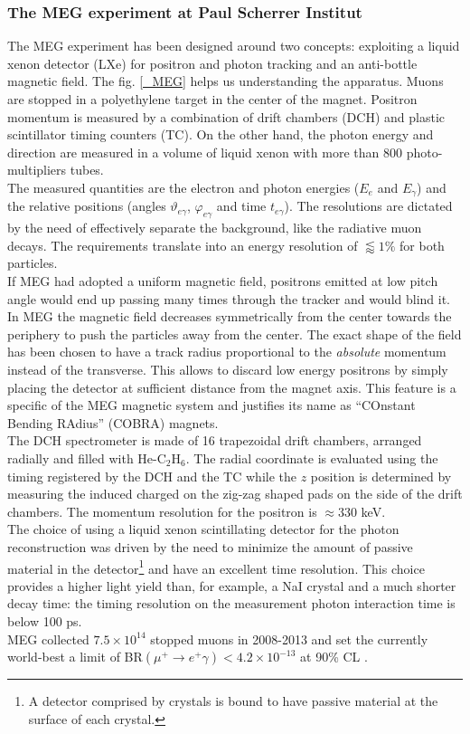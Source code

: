\documentclass[12pt,a4paper,openright, oneside, titlepage]{book} %
\begin{document}
\subsubsection{The MEG experiment at Paul Scherrer Institut}
The MEG experiment \cite{MEG} has been designed around two concepts: exploiting a liquid xenon detector (LXe) for positron and photon tracking and an anti-bottle magnetic field. 
The fig. \ref{_MEG} helps us understanding the apparatus. Muons are stopped in a polyethylene target in the center of the magnet. Positron momentum is measured by a combination of drift chambers (DCH) and plastic scintillator timing counters (TC). 
On the other hand, the photon energy and direction are measured in a volume of liquid xenon with more than 800 photo-multipliers tubes.\\
The measured quantities are the electron and photon energies ($E_e$ and $E_\gamma$) and the relative positions (angles $\vartheta_{e\gamma}$, $\varphi_{e\gamma}$ and time $t_{e\gamma}$). 
The resolutions are dictated by the need of effectively separate the background, like the radiative muon decays. 
The requirements translate into an energy resolution of $\lessapprox 1\%$ for both particles.\\
If MEG had adopted a uniform magnetic field, positrons emitted at low pitch angle would end up passing many times through the tracker and would blind it. 
In MEG the magnetic field decreases symmetrically from the center towards the periphery to push the particles away from the center. 
The exact shape of the field has been chosen to have a track radius proportional to the \textit{absolute} momentum instead of the transverse. 
This allows to discard low energy positrons by simply placing the detector at sufficient distance from the magnet axis. 
This feature is a specific of the MEG magnetic system and justifies its name as ``COnstant Bending RAdius'' (COBRA) magnets.\\
The DCH spectrometer is made of 16 trapezoidal drift chambers, arranged radially and filled with He-C$_2$H$_6$. The radial coordinate is evaluated using the timing registered by the DCH and the TC while the $z$ position is determined by measuring the induced charged on the zig-zag shaped pads on the side of the drift chambers. The momentum resolution for the positron is $\approx330$ keV.\\
The choice of using a liquid xenon scintillating detector for the photon reconstruction was driven by the need to minimize the amount of passive material in the detector\footnote{A detector comprised by crystals is bound to have passive material at the surface of each crystal.} and have an excellent time resolution. 
This choice provides a higher light yield than, for example, a NaI crystal and a much shorter decay time: the timing resolution on the measurement photon interaction time is below 100 ps.\\
MEG collected $7.5\times10^{14}$ stopped muons in  2008-2013 and set the currently world-best a limit of BR$(\mu^+\rightarrow e^+\gamma)<4.2\times10^{-13}$ at 90\% CL \cite{MEG}.
\end{document}
